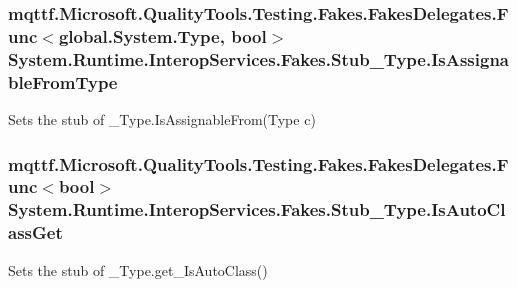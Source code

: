 \hypertarget{class_system_1_1_runtime_1_1_interop_services_1_1_fakes_1_1_stub___type_ac2462ba30a1be8f55915dbbd18ef924f}{
\subsubsection[{Is\-Assignable\-From\-Type}]{\setlength{\rightskip}{0pt plus 5cm}mqttf.\-Microsoft.\-Quality\-Tools.\-Testing.\-Fakes.\-Fakes\-Delegates.\-Func$<$global.\-System.\-Type, bool$>$ System.\-Runtime.\-Interop\-Services.\-Fakes.\-Stub\-\_\-\-Type.\-Is\-Assignable\-From\-Type}}\label{class_system_1_1_runtime_1_1_interop_services_1_1_fakes_1_1_stub___type_ac2462ba30a1be8f55915dbbd18ef924f}


Sets the stub of \-\_\-\-Type.\-Is\-Assignable\-From(\-Type c)

\hypertarget{class_system_1_1_runtime_1_1_interop_services_1_1_fakes_1_1_stub___type_adb9897a0b857ce33a79d1749c49d7035}{
\subsubsection[{Is\-Auto\-Class\-Get}]{\setlength{\rightskip}{0pt plus 5cm}mqttf.\-Microsoft.\-Quality\-Tools.\-Testing.\-Fakes.\-Fakes\-Delegates.\-Func$<$bool$>$ System.\-Runtime.\-Interop\-Services.\-Fakes.\-Stub\-\_\-\-Type.\-Is\-Auto\-Class\-Get}}\label{class_system_1_1_runtime_1_1_interop_services_1_1_fakes_1_1_stub___type_adb9897a0b857ce33a79d1749c49d7035}


Sets the stub of \-\_\-\-Type.\-get\-\_\-\-Is\-Auto\-Class()

